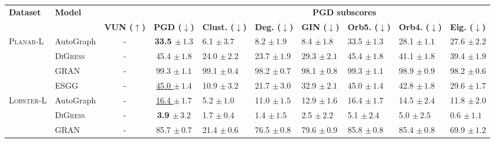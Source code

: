 \begin{tabular}{llccp{1.6cm}p{1.6cm}p{1.6cm}p{1.6cm}p{1.6cm}p{1.6cm}}
\toprule
\textbf{Dataset} & \textbf{Model} &  &  & \multicolumn{6}{c}{\textbf{PGD subscores}} \\
\cmidrule(lr){5-10}
 &  & \textbf{VUN ($\uparrow$)} & \textbf{PGD ($\downarrow$)} & \textbf{Clust. ($\downarrow$)} & \textbf{Deg. ($\downarrow$)} & \textbf{GIN ($\downarrow$)} & \textbf{Orb5. ($\downarrow$)} & \textbf{Orb4. ($\downarrow$)} & \textbf{Eig. ($\downarrow$)} \\
\midrule
\textsc{Planar-L} & AutoGraph & - & \textbf{33.5 $\pm\,\scriptstyle{1.3}$} & 6.1 $\pm\,\scriptstyle{3.7}$ & 8.2 $\pm\,\scriptstyle{1.9}$ & 8.4 $\pm\,\scriptstyle{1.8}$ & 33.5 $\pm\,\scriptstyle{1.3}$ & 28.1 $\pm\,\scriptstyle{1.1}$ & 27.6 $\pm\,\scriptstyle{2.2}$ \\
 & \textsc{DiGress} & - & 45.4 $\pm\,\scriptstyle{1.8}$ & 24.0 $\pm\,\scriptstyle{2.2}$ & 23.7 $\pm\,\scriptstyle{1.9}$ & 29.3 $\pm\,\scriptstyle{2.1}$ & 45.4 $\pm\,\scriptstyle{1.8}$ & 41.1 $\pm\,\scriptstyle{1.8}$ & 39.4 $\pm\,\scriptstyle{1.9}$ \\
 & GRAN & - & 99.3 $\pm\,\scriptstyle{1.1}$ & 99.1 $\pm\,\scriptstyle{0.4}$ & 98.2 $\pm\,\scriptstyle{0.7}$ & 98.1 $\pm\,\scriptstyle{0.8}$ & 99.3 $\pm\,\scriptstyle{1.1}$ & 98.9 $\pm\,\scriptstyle{0.9}$ & 98.2 $\pm\,\scriptstyle{0.6}$ \\
 & ESGG & - & \underline{45.0 $\pm\,\scriptstyle{1.4}$} & 10.9 $\pm\,\scriptstyle{3.2}$ & 21.7 $\pm\,\scriptstyle{3.0}$ & 32.9 $\pm\,\scriptstyle{2.1}$ & 45.0 $\pm\,\scriptstyle{1.4}$ & 42.8 $\pm\,\scriptstyle{1.8}$ & 29.6 $\pm\,\scriptstyle{1.7}$ \\
\midrule
\textsc{Lobster-L} & AutoGraph & - & \underline{16.4 $\pm\,\scriptstyle{1.7}$} & 5.2 $\pm\,\scriptstyle{1.0}$ & 11.0 $\pm\,\scriptstyle{1.5}$ & 12.9 $\pm\,\scriptstyle{1.6}$ & 16.4 $\pm\,\scriptstyle{1.7}$ & 14.5 $\pm\,\scriptstyle{2.4}$ & 11.8 $\pm\,\scriptstyle{2.0}$ \\
 & \textsc{DiGress} & - & \textbf{3.9 $\pm\,\scriptstyle{3.2}$} & 1.7 $\pm\,\scriptstyle{0.4}$ & 1.4 $\pm\,\scriptstyle{1.5}$ & 2.5 $\pm\,\scriptstyle{2.2}$ & 5.1 $\pm\,\scriptstyle{2.4}$ & 5.0 $\pm\,\scriptstyle{2.5}$ & 0.6 $\pm\,\scriptstyle{1.1}$ \\
 & GRAN & - & 85.7 $\pm\,\scriptstyle{0.7}$ & 21.4 $\pm\,\scriptstyle{0.6}$ & 76.5 $\pm\,\scriptstyle{0.8}$ & 79.6 $\pm\,\scriptstyle{0.9}$ & 85.8 $\pm\,\scriptstyle{0.8}$ & 85.4 $\pm\,\scriptstyle{0.8}$ & 69.9 $\pm\,\scriptstyle{1.2}$ \\

\end{tabular}
